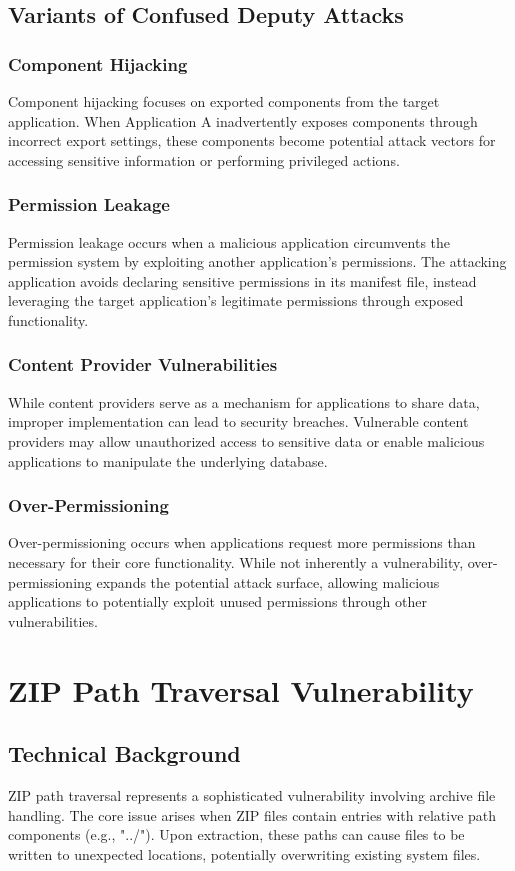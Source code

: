 \documentclass{article}
\begin{document}
\subsection{Variants of Confused Deputy Attacks}
\subsubsection{Component Hijacking}
Component hijacking focuses on exported components from the target application. When Application A inadvertently exposes components through incorrect export settings, these components become potential attack vectors for accessing sensitive information or performing privileged actions.

\subsubsection{Permission Leakage}
Permission leakage occurs when a malicious application circumvents the permission system by exploiting another application's permissions. The attacking application avoids declaring sensitive permissions in its manifest file, instead leveraging the target application's legitimate permissions through exposed functionality.

\subsubsection{Content Provider Vulnerabilities}
While content providers serve as a mechanism for applications to share data, improper implementation can lead to security breaches. Vulnerable content providers may allow unauthorized access to sensitive data or enable malicious applications to manipulate the underlying database.

\subsubsection{Over-Permissioning}
Over-permissioning occurs when applications request more permissions than necessary for their core functionality. While not inherently a vulnerability, over-permissioning expands the potential attack surface, allowing malicious applications to potentially exploit unused permissions through other vulnerabilities.

\section{ZIP Path Traversal Vulnerability}
\subsection{Technical Background}
ZIP path traversal represents a sophisticated vulnerability involving archive file handling. The core issue arises when ZIP files contain entries with relative path components (e.g., "../"). Upon extraction, these paths can cause files to be written to unexpected locations, potentially overwriting existing system files.
\end{document}
